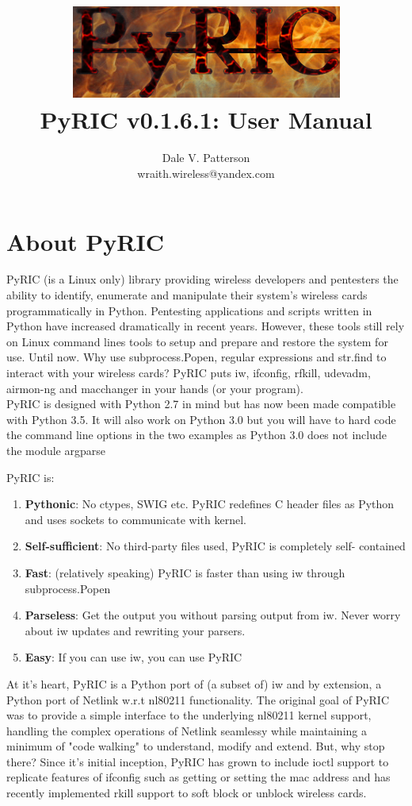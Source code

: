 \documentclass[11pt]{article}
\title{\includegraphics[scale=1]{logo}\\ PyRIC v0.1.6.1: User Manual}
\author{Dale V. Patterson\\ wraith.wireless@yandex.com}
\begin{document}
\maketitle
\tableofcontents

\section{About PyRIC}\label{sec:About}
PyRIC (is a Linux only) library providing wireless developers and pentesters the
ability to identify, enumerate and manipulate their system's wireless cards
programmatically in Python. Pentesting applications and scripts written in Python
have increased dramatically in recent years. However, these tools still rely on
Linux command lines tools to setup and prepare and restore the system for use.
Until now. Why use subprocess.Popen, regular expressions and str.find to interact
with your wireless cards? PyRIC puts iw, ifconfig, rfkill, udevadm, airmon-ng and 
macchanger in your hands (or your program). \\

PyRIC is designed with Python 2.7 in mind but has now been made compatible with 
Python 3.5. It will also work on Python 3.0 but you will have to hard code the 
command line options in the two examples as Python 3.0 does not include the module 
argparse

PyRIC is:
\begin{enumerate}
\item \textbf{Pythonic}: No ctypes, SWIG etc. PyRIC redefines C header files as 
Python and uses sockets to communicate with kernel.
\item \textbf{Self-sufficient}: No third-party files used, PyRIC is completely self-
contained
\item \textbf{Fast}: (relatively speaking) PyRIC is faster than using iw through 
subprocess.Popen
\item \textbf{Parseless}: Get the output you without parsing output from iw. Never 
worry about iw updates and rewriting your parsers.
\item \textbf{Easy}: If you can use iw, you can use PyRIC
\end{enumerate}

At it's heart, PyRIC is a Python port of (a subset of) iw and by extension, a
Python port of Netlink w.r.t nl80211 functionality. The original goal of PyRIC
was to provide a simple interface to the underlying nl80211 kernel support,
handling the complex operations of Netlink seamlessy while maintaining a minimum
of "code walking" to understand, modify and extend. But, why stop there? Since
it's initial inception, PyRIC has grown to include ioctl support to replicate
features of ifconfig such as getting or setting the mac address and has recently
implemented rkill support to soft block or unblock wireless cards.\\
\end{document}
